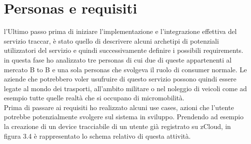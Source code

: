 \documentclass[a4paper,titlepage,12pt]{book}
\begin{document}
\section{
\sffamily Personas e requisiti}
l'Ultimo passo prima di iniziare l'implementazione e l'integrazione effettiva del servizio traccar, è stato quello di descrivere alcuni archetipi di potenziali utilizzatori del servizio e quindi successivamente definire i possibili requirements.\\
in questa fase ho analizzato tre personas di cui due di queste appartenenti al mercato B to B e una sola personas che svolgeva il ruolo di consumer normale. Le aziende che potrebbero voler usufruire di questo servizio possono quindi essere legate al mondo dei trasporti, all'ambito militare o nel noleggio di veicoli come ad esempio tutte quelle realtà che si occupano di micromobilità.\\
Prima di passare ai requisiti ho realizzato alcuni use cases, azioni che l'utente potrebbe potenzialmente svolgere sul sistema in sviluppo. Prendendo ad esempio la creazione di un device tracciabile di un utente già registrato su zCloud, in figura 3.4 è rappresentato lo schema relativo di questa attività.
\end{document}
